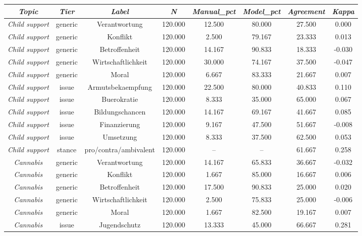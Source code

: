 \begin{tabular}{c c c c c c c c}
      \hline
      \textit{Topic} & \textit{Tier} & \textit{Label} & \textit{N} & \textit{Manual\_pct} & \textit{Model\_pct} & \textit{Agreement} & \textit{Kappa} \\
      \hline
      \textit{Child support} & generic & Verantwortung & 120.000 & 12.500 & 80.000 & 27.500 & 0.000 \\
      \textit{Child support} & generic & Konflikt & 120.000 & 2.500 & 79.167 & 23.333 & 0.013 \\
      \textit{Child support} & generic & Betroffenheit & 120.000 & 14.167 & 90.833 & 18.333 & -0.030 \\
      \textit{Child support} & generic & Wirtschaftlichkeit & 120.000 & 30.000 & 74.167 & 37.500 & -0.047 \\
      \textit{Child support} & generic & Moral & 120.000 & 6.667 & 83.333 & 21.667 & 0.007 \\
      \textit{Child support} & issue & Armutsbekaempfung & 120.000 & 22.500 & 80.000 & 40.833 & 0.110 \\
      \textit{Child support} & issue & Buerokratie & 120.000 & 8.333 & 35.000 & 65.000 & 0.067 \\
      \textit{Child support} & issue & Bildungschancen & 120.000 & 14.167 & 69.167 & 41.667 & 0.085 \\
      \textit{Child support} & issue & Finanzierung & 120.000 & 9.167 & 47.500 & 51.667 & -0.008 \\
      \textit{Child support} & issue & Umsetzung & 120.000 & 8.333 & 37.500 & 62.500 & 0.053 \\
      \textit{Child support} & stance & pro/contra/ambivalent & 120.000 & -- & -- & 61.667 & 0.258 \\
      \textit{Cannabis} & generic & Verantwortung & 120.000 & 14.167 & 65.833 & 36.667 & -0.032 \\
      \textit{Cannabis} & generic & Konflikt & 120.000 & 1.667 & 85.000 & 16.667 & 0.006 \\
      \textit{Cannabis} & generic & Betroffenheit & 120.000 & 17.500 & 90.833 & 25.000 & 0.020 \\
      \textit{Cannabis} & generic & Wirtschaftlichkeit & 120.000 & 2.500 & 75.833 & 25.000 & -0.006 \\
      \textit{Cannabis} & generic & Moral & 120.000 & 1.667 & 82.500 & 19.167 & 0.007 \\
      \textit{Cannabis} & issue & Jugendschutz & 120.000 & 13.333 & 45.000 & 66.667 & 0.281 \\

\end{tabular}
